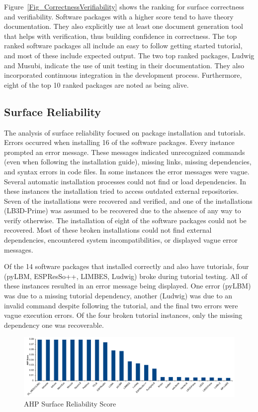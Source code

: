 \documentclass[final, 3p, times, authoryear]{elsarticle}
\begin{document}
Figure~\ref{Fig_CorrectnessVerifiability} shows the ranking for surface
correctness and verifiability. Software packages with a higher score tend to
have theory documentation. They also explicitly use at least one document
generation tool that helps with verification, thus building confidence in
correctness. The top ranked software packages all include an easy to follow
getting started tutorial, and most of these include expected output. The two top
ranked packages, Ludwig and Musubi, indicate the use of unit testing in their
documentation. They also incorporated continuous integration in the development
process. Furthermore, eight of the top 10 ranked packages are noted as being
alive.

\subsection{Surface Reliability}

The analysis of surface reliability focused on package installation and
tutorials. Errors occurred when installing 16 of the software packages. Every
instance prompted an error message. These messages indicated unrecognized
commands (even when following the installation guide), missing links, missing
dependencies, and syntax errors in code files. In some instances the error
messages were vague. Several automatic installation processes could not find or
load dependencies. In these instances the installation tried to access outdated
external repositories. Seven of the installations were recovered and verified,
and one of the installations (LB3D-Prime) was assumed to be recovered due to the
absence of any way to verify otherwise. The installation of eight of the software
packages could not be recovered. Most of these broken installations could not
find external dependencies, encountered system incompatibilities, or displayed
vague error messages.

Of the 14 software packages that installed correctly and also have tutorials,
four (pyLBM, ESPResSo++, LIMBES, Ludwig) broke during tutorial testing. All of
these instances resulted in an error message being displayed. One error (pyLBM)
was due to a missing tutorial dependency, another (Ludwig) was due to an invalid
command despite following the tutorial, and the final two errors were vague
execution errors. Of the four broken tutorial instances, only the missing
dependency one was recoverable. 

\begin{figure}[h!]
	\begin{center}
		\includegraphics[width=1.0\textwidth]{./figures/reliability_chart.pdf}
		\caption{AHP Surface Reliability Score}
		\label{Fig_Reliability}
	\end{center}
\end{figure}
\end{document}
